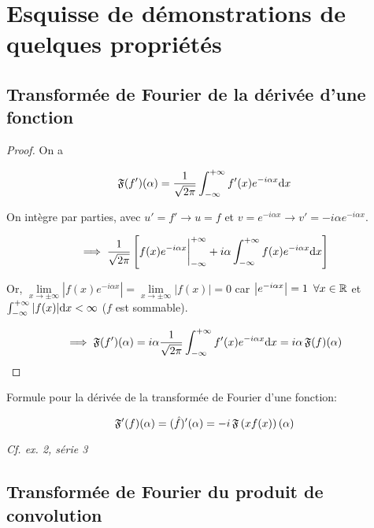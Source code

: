 \section{Esquisse de démonstrations de quelques propriétés}

\subsection{Transformée de Fourier de la dérivée d'une fonction}

\begin{proof}
    On a
    
    \[
    \mathfrak{F}(f')(\alpha) =
    \frac{1}{\sqrt{2 \pi}} \int_{-\infty}^{+\infty} f'(x) e^{-i\alpha x} \mathrm{d}x
    \]
    
    On intègre par parties, avec $u' = f' \rightarrow u = f$ et $v = e^{-i\alpha x} \rightarrow v' = -i \alpha e^{-i\alpha x}$.
    
    \[
    \implies \frac{1}{\sqrt{2 \pi}} \left[
    f(x) e^{-i\alpha x} \bigg|_{-\infty}^{+\infty} +
    i\alpha \int_{-\infty}^{+\infty} f(x)e^{-i\alpha x} \mathrm{d}x
    \right]
    \]
    
    Or, $\lim\limits_{x \rightarrow \pm \infty} \left| f(x) e^{-i\alpha x}\right| = \lim\limits_{x \rightarrow \pm \infty} \left|f(x)\right| = 0$ car $\left|e^{-i\alpha x}\right| = 1 \enspace \forall x\in \mathbb{R}$ et $\int_{-\infty}^{+\infty} |f(x)| \mathrm{d}x < \infty$ ($f$ est sommable).
    
    \[
    \implies \mathfrak{F}(f')(\alpha) = i\alpha \frac{1}{\sqrt{2 \pi}} \int_{-\infty}^{+\infty} f'(x) e^{-i\alpha x} \mathrm{d}x = i\alpha \, \mathfrak{F}(f)(\alpha)
    \]
\end{proof}

\begin{remark}
    Formule pour la dérivée de la transformée de Fourier d'une fonction:
    
    \[\mathfrak{F}'(f)(\alpha) = (\hat{f})'(\alpha) = -i \, \mathfrak{F}\left(xf(x)\right)(\alpha)\]
    
    \textit{Cf. ex. 2, série 3}
\end{remark}


\subsection{Transformée de Fourier du produit de convolution}

